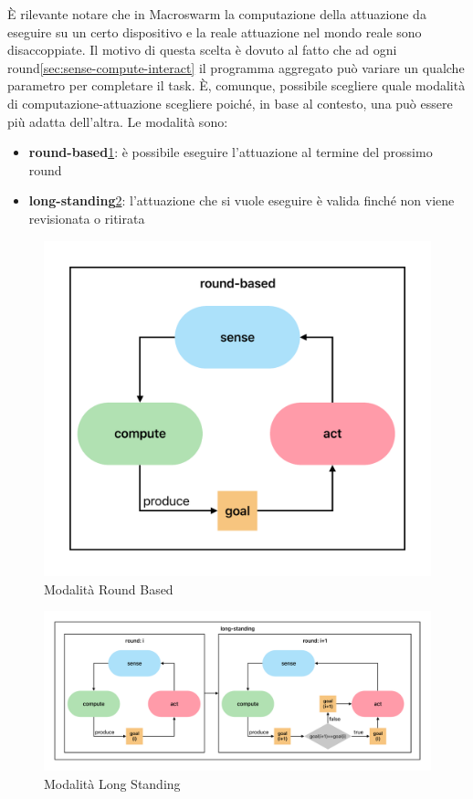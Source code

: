\documentclass[12pt,a4paper,openright,twoside]{book}
\begin{document}
È rilevante notare che in Macroswarm la computazione della attuazione da eseguire su un certo dispositivo e la reale attuazione nel mondo reale sono disaccoppiate. Il motivo di questa scelta è dovuto al fatto che ad ogni round\cref{sec:sense-compute-interact} il programma aggregato può variare un qualche parametro per completare il task. È, comunque, possibile scegliere quale modalità di computazione-attuazione scegliere poiché, in base al contesto, una può essere più adatta dell'altra. Le modalità sono:

\begin{itemize}
    \item \textbf{round-based}\cref{fig:round-based}: è possibile eseguire l'attuazione al termine del prossimo round
    \item \textbf{long-standing}\cref{fig:long-standong}: l'attuazione che si vuole eseguire è valida finché non viene revisionata o ritirata
\end{itemize}

\begin{figure}
    \centering
    \includegraphics[width=.6\linewidth]{figures/round-based.pdf}
    \caption{Modalità Round Based}
    \label{fig:round-based}
\end{figure}

\begin{figure}
    \centering
    \includegraphics[width=.99\linewidth]{figures/long-standing.pdf}
    \caption{Modalità Long Standing}
    \label{fig:long-standong}
\end{figure}
\end{document}
